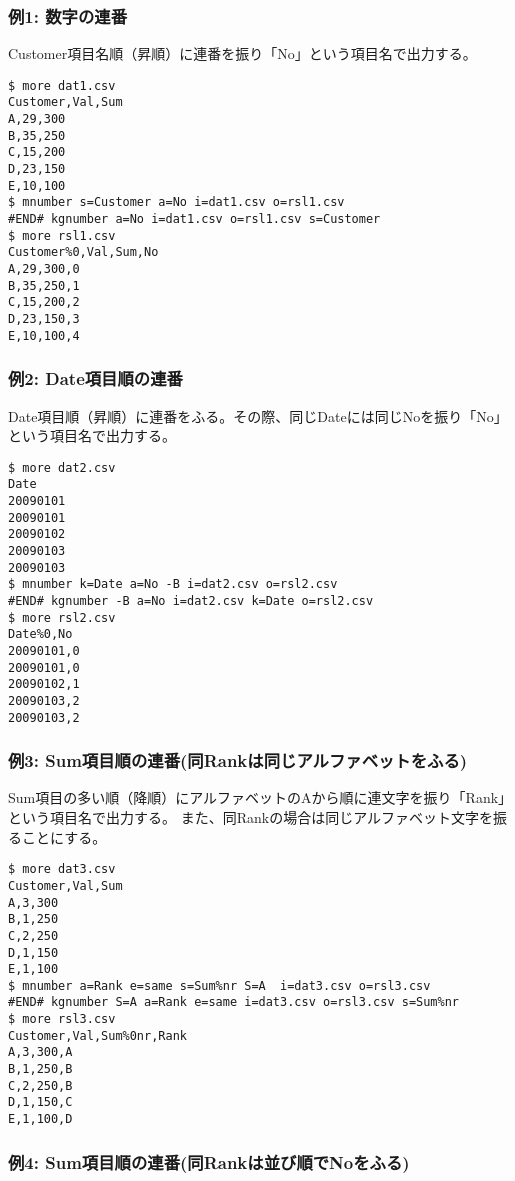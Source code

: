 \subsubsection*{例1: 数字の連番}

Customer項目名順（昇順）に連番を振り「No」という項目名で出力する。


\begin{Verbatim}[baselinestretch=0.7,frame=single]
$ more dat1.csv
Customer,Val,Sum
A,29,300
B,35,250
C,15,200
D,23,150
E,10,100
$ mnumber s=Customer a=No i=dat1.csv o=rsl1.csv
#END# kgnumber a=No i=dat1.csv o=rsl1.csv s=Customer
$ more rsl1.csv
Customer%0,Val,Sum,No
A,29,300,0
B,35,250,1
C,15,200,2
D,23,150,3
E,10,100,4
\end{Verbatim}
\subsubsection*{例2: Date項目順の連番}

Date項目順（昇順）に連番をふる。その際、同じDateには同じNoを振り「No」という項目名で出力する。


\begin{Verbatim}[baselinestretch=0.7,frame=single]
$ more dat2.csv
Date
20090101
20090101
20090102
20090103
20090103
$ mnumber k=Date a=No -B i=dat2.csv o=rsl2.csv
#END# kgnumber -B a=No i=dat2.csv k=Date o=rsl2.csv
$ more rsl2.csv
Date%0,No
20090101,0
20090101,0
20090102,1
20090103,2
20090103,2
\end{Verbatim}
\subsubsection*{例3: Sum項目順の連番(同Rankは同じアルファベットをふる)}

Sum項目の多い順（降順）にアルファベットのAから順に連文字を振り「Rank」という項目名で出力する。
また、同Rankの場合は同じアルファベット文字を振ることにする。


\begin{Verbatim}[baselinestretch=0.7,frame=single]
$ more dat3.csv
Customer,Val,Sum
A,3,300
B,1,250
C,2,250
D,1,150
E,1,100
$ mnumber a=Rank e=same s=Sum%nr S=A  i=dat3.csv o=rsl3.csv
#END# kgnumber S=A a=Rank e=same i=dat3.csv o=rsl3.csv s=Sum%nr
$ more rsl3.csv
Customer,Val,Sum%0nr,Rank
A,3,300,A
B,1,250,B
C,2,250,B
D,1,150,C
E,1,100,D
\end{Verbatim}
\subsubsection*{例4: Sum項目順の連番(同Rankは並び順でNoをふる)}

